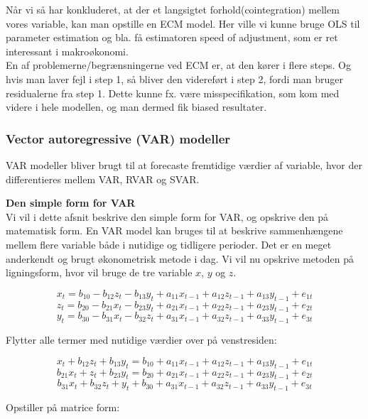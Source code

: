 \documentclass[
  10pt,
]{article}
\begin{document}
Når vi så har konkluderet, at der et langsigtet forhold(cointegration)
mellem vores variable, kan man opstille en ECM model. Her ville vi kunne
bruge OLS til parameter estimation og bla. få estimatoren speed of
adjustment, som er ret interessant i makroøkonomi.\\

En af problemerne/begrænsningerne ved ECM er, at den kører i flere
steps. Og hvis man laver fejl i step 1, så bliver den videreført i step
2, fordi man bruger residualerne fra step 1. Dette kunne fx. være
misspecifikation, som kom med videre i hele modellen, og man dermed fik
biased resultater.

\hypertarget{vector-autoregressive-var-modeller}{%
\subsubsection{Vector autoregressive (VAR)
modeller}\label{vector-autoregressive-var-modeller}}

VAR modeller bliver brugt til at forecaste fremtidige værdier af
variable, hvor der differentieres mellem VAR, RVAR og SVAR.

\textbf{Den simple form for VAR}\\
Vi vil i dette afsnit beskrive den simple form for VAR, og opskrive den
på matematisk form. En VAR model kan bruges til at beskrive
sammenhængene mellem flere variable både i nutidige og tidligere
perioder. Det er en meget anderkendt og brugt økonometrisk metode i dag.
Vi vil nu opskrive metoden på ligningsform, hvor vil bruge de tre
variable \(x\), \(y\) og \(z\).

\[x_t=b_{10}-b_{12}z_t-b_{13}y_t+a_{11}x_{t-1}+a_{12}z_{t-1}+a_{13}y_{t-1}+e_{1t} \]
\[z_t=b_{20}-b_{21}x_t-b_{23}y_t+a_{21}x_{t-1}+a_{22}z_{t-1}+a_{23}y_{t-1}+e_{2t} \]
\[y_t=b_{30}-b_{31}x_t-b_{32}z_t+a_{31}x_{t-1}+a_{32}z_{t-1}+a_{33}y_{t-1}+e_{3t} \]

Flytter alle termer med nutidige værdier over på venstresiden:

\[x_t+b_{12}z_t+b_{13}y_t=b_{10}+a_{11}x_{t-1}+a_{12}z_{t-1}+a_{13}y_{t-1}+e_{1t} \]
\[b_{21}x_t+z_t+b_{23}y_t=b_{20}+a_{21}x_{t-1}+a_{22}z_{t-1}+a_{23}y_{t-1}+e_{2t} \]
\[b_{31}x_t+b_{32}z_t+y_t+b_{30}+a_{31}x_{t-1}+a_{32}z_{t-1}+a_{33}y_{t-1}+e_{3t} \]

Opstiller på matrice form:
\end{document}
